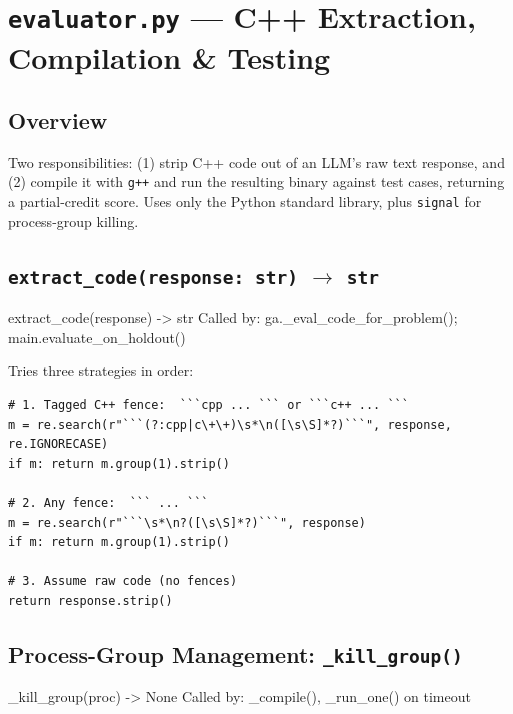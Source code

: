 \documentclass[11pt,a4paper]{report}
\newcommand{\fn}[1]{\texttt{#1}}
\newcommand{\pyf}[1]{\texttt{#1}}
\begin{document}
\chapter{\pyf{evaluator.py} --- C++ Extraction, Compilation \& Testing}

\section{Overview}

Two responsibilities: (1) strip C++ code out of an LLM's raw text response, and
(2) compile it with \fn{g++} and run the resulting binary against test cases, returning
a partial-credit score.  Uses only the Python standard library, plus \fn{signal} for
process-group killing.

\section{\fn{extract\_code(response: str)} $\to$ \fn{str}}

\begin{spec}{extract\_code(response) -> str}
Called by: ga.\_eval\_code\_for\_problem(); main.evaluate\_on\_holdout()
\end{spec}

Tries three strategies in order:

\begin{lstlisting}[style=py]
# 1. Tagged C++ fence:  ```cpp ... ``` or ```c++ ... ```
m = re.search(r"```(?:cpp|c\+\+)\s*\n([\s\S]*?)```", response, re.IGNORECASE)
if m: return m.group(1).strip()

# 2. Any fence:  ``` ... ```
m = re.search(r"```\s*\n?([\s\S]*?)```", response)
if m: return m.group(1).strip()

# 3. Assume raw code (no fences)
return response.strip()
\end{lstlisting}

\section{Process-Group Management: \fn{\_kill\_group()}}

\begin{spec}{\_kill\_group(proc) -> None}
Called by: \_compile(), \_run\_one() on timeout
\end{spec}
\end{document}
